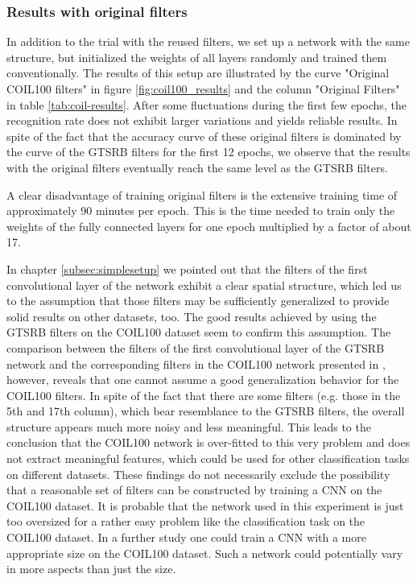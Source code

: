 \documentclass[11pt, a4paper]{article}
\begin{document}
\subsubsection{Results with original filters}

In addition to the trial with the reused filters, we set up a network with the same structure, but initialized the weights of all layers randomly and trained them conventionally. The results of this setup are illustrated by the curve "Original COIL100 filters" in figure \ref{fig:coil100_results} and the column "Original Filters" in table \ref{tab:coil-results}. After some fluctuations during the first few epochs, the recognition rate does not exhibit larger variations and yields reliable results. In spite of the fact that the accuracy curve of these original filters is dominated by the curve of the GTSRB filters for the first 12 epochs, we observe that the results with the original filters eventually reach the same level as the GTSRB filters.

A clear disadvantage of training original filters is the extensive training time of approximately 90 minutes per epoch. This is the time needed to train only the weights of the fully connected layers for one epoch multiplied by a factor of about 17.

In chapter \ref{subsec:simplesetup} we pointed out that the filters of the first convolutional layer of the  network exhibit a clear spatial structure, which led us to the assumption that those filters may be sufficiently generalized to provide solid results on other datasets, too. The good results achieved by using the GTSRB filters on the COIL100 dataset seem to confirm this assumption. The comparison between the filters of the first convolutional layer of the GTSRB network and the corresponding filters in the COIL100 network presented in , however, reveals that one cannot assume a good generalization behavior for the COIL100 filters. In spite of the fact that there are some filters (e.g. those in the 5th and 17th column), which bear resemblance to the GTSRB filters, the overall structure appears much more noisy and less meaningful. This leads to the conclusion that the COIL100 network is over-fitted to this very problem and does not extract meaningful features, which could be used for other classification tasks on different datasets. These findings do not necessarily exclude the possibility that a reasonable set of filters can be constructed by training a CNN on the COIL100 dataset. It is probable that the network used in this experiment is just too oversized for a rather easy problem like the classification task on the COIL100 dataset. In a further study one could train a CNN with a more appropriate size on the COIL100 dataset. Such a network could potentially vary in more aspects than just the size.
\end{document}
